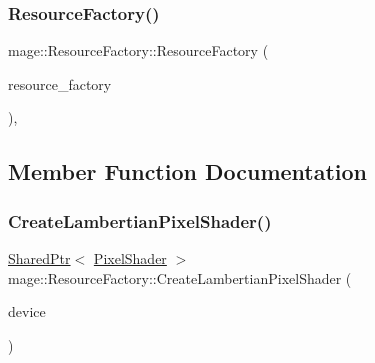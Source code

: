 \hypertarget{classmage_1_1_resource_factory_ab4e46a6c9ac15d1584c6e28bb1e65708}{}\label{classmage_1_1_resource_factory_ab4e46a6c9ac15d1584c6e28bb1e65708} 
\subsubsection{\texorpdfstring{Resource\+Factory()}{ResourceFactory()}\hspace{0.1cm}{\footnotesize\ttfamily [3/3]}}
{\footnotesize\ttfamily mage\+::\+Resource\+Factory\+::\+Resource\+Factory (\begin{DoxyParamCaption}\item[{\hyperlink{classmage_1_1_resource_factory}{Resource\+Factory} \&\&}]{resource\+\_\+factory }\end{DoxyParamCaption})\hspace{0.3cm}{\ttfamily [private]}, {\ttfamily [delete]}}



\subsection{Member Function Documentation}
\hypertarget{classmage_1_1_resource_factory_a4d6f68f3bf0fae659f9b7734e8428d31}{}\label{classmage_1_1_resource_factory_a4d6f68f3bf0fae659f9b7734e8428d31} 
\subsubsection{\texorpdfstring{Create\+Lambertian\+Pixel\+Shader()}{CreateLambertianPixelShader()}}
{\footnotesize\ttfamily \hyperlink{namespacemage_a1e01ae66713838a7a67d30e44c67703e}{Shared\+Ptr}$<$ \hyperlink{classmage_1_1_pixel_shader}{Pixel\+Shader} $>$ mage\+::\+Resource\+Factory\+::\+Create\+Lambertian\+Pixel\+Shader (\begin{DoxyParamCaption}\item[{I\+D3\+D11\+Device2 \&}]{device }\end{DoxyParamCaption})}

\hypertarget{classmage_1_1_resource_factory_a9cbe973114ec5a4bd16ecf7829bcd26a}{}\label{classmage_1_1_resource_factory_a9cbe973114ec5a4bd16ecf7829bcd26a} 
